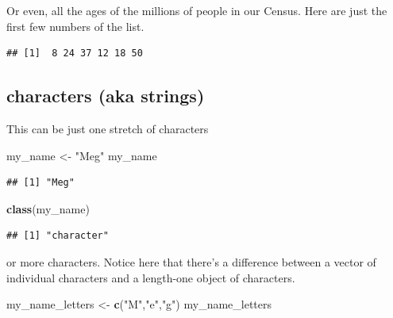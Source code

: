 \documentclass[
]{book}
\newenvironment{Shaded}{\begin{snugshade}}{\end{snugshade}}
\newcommand{\KeywordTok}[1]{\textcolor[rgb]{0.13,0.29,0.53}{\textbf{#1}}}
\newcommand{\NormalTok}[1]{#1}
\newcommand{\OperatorTok}[1]{\textcolor[rgb]{0.81,0.36,0.00}{\textbf{#1}}}
\newcommand{\StringTok}[1]{\textcolor[rgb]{0.31,0.60,0.02}{#1}}
\theoremstyle{definition}
\theoremstyle{definition}
\theoremstyle{definition}
\theoremstyle{definition}
\theoremstyle{remark}
\begin{document}
Or even, all the ages of the millions of people in our Census. Here are just the first few numbers of the list.

\begin{Shaded}
\end{Shaded}

\begin{verbatim}
## [1]  8 24 37 12 18 50
\end{verbatim}

\hypertarget{characters-aka-strings}{%
\subsection{characters (aka strings)}\label{characters-aka-strings}}

This can be just one stretch of characters

\begin{Shaded}
\begin{Highlighting}[]
\NormalTok{my_name <-}\StringTok{ "Meg"}
\NormalTok{my_name}
\end{Highlighting}
\end{Shaded}

\begin{verbatim}
## [1] "Meg"
\end{verbatim}

\begin{Shaded}
\begin{Highlighting}[]
\KeywordTok{class}\NormalTok{(my_name)}
\end{Highlighting}
\end{Shaded}

\begin{verbatim}
## [1] "character"
\end{verbatim}

or more characters. Notice here that there's a difference between a vector of individual characters and a length-one object of characters.

\begin{Shaded}
\begin{Highlighting}[]
\NormalTok{my_name_letters <-}\StringTok{  }\KeywordTok{c}\NormalTok{(}\StringTok{"M"}\NormalTok{,}\StringTok{"e"}\NormalTok{,}\StringTok{"g"}\NormalTok{)}
\NormalTok{my_name_letters}
\end{Highlighting}
\end{Shaded}
\end{document}

